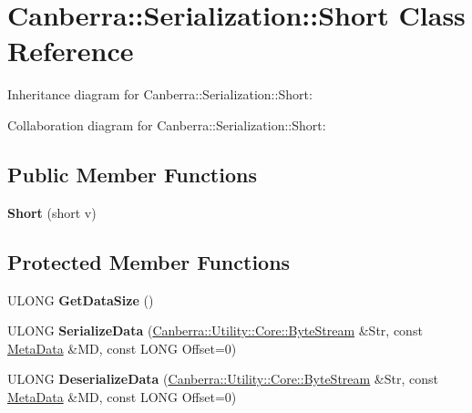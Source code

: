 \hypertarget{class_canberra_1_1_serialization_1_1_short}{}\section{Canberra\+:\+:Serialization\+:\+:Short Class Reference}
\label{class_canberra_1_1_serialization_1_1_short}


Inheritance diagram for Canberra\+:\+:Serialization\+:\+:Short\+:


Collaboration diagram for Canberra\+:\+:Serialization\+:\+:Short\+:
\subsection*{Public Member Functions}
\begin{DoxyCompactItemize}
\item 
\mbox{\label{class_canberra_1_1_serialization_1_1_short_a87e8dfd78378c4256847f9ce590d4a84}} 
{\bfseries Short} (short v)
\end{DoxyCompactItemize}
\subsection*{Protected Member Functions}
\begin{DoxyCompactItemize}
\item 
\mbox{\label{class_canberra_1_1_serialization_1_1_short_abd891a5dca90204aeaff850ccffca8ff}} 
U\+L\+O\+NG {\bfseries Get\+Data\+Size} ()
\item 
\mbox{\label{class_canberra_1_1_serialization_1_1_short_a3f97de2369a8d231578373cac560dcdb}} 
U\+L\+O\+NG {\bfseries Serialize\+Data} (\hyperlink{class_canberra_1_1_utility_1_1_core_1_1_byte_stream}{Canberra\+::\+Utility\+::\+Core\+::\+Byte\+Stream} \&Str, const \hyperlink{class_canberra_1_1_serialization_1_1_meta_data}{Meta\+Data} \&MD, const L\+O\+NG Offset=0)
\item 
\mbox{\label{class_canberra_1_1_serialization_1_1_short_a68f90b6f34f202914141e398a0e36754}} 
U\+L\+O\+NG {\bfseries Deserialize\+Data} (\hyperlink{class_canberra_1_1_utility_1_1_core_1_1_byte_stream}{Canberra\+::\+Utility\+::\+Core\+::\+Byte\+Stream} \&Str, const \hyperlink{class_canberra_1_1_serialization_1_1_meta_data}{Meta\+Data} \&MD, const L\+O\+NG Offset=0)
\end{DoxyCompactItemize}
